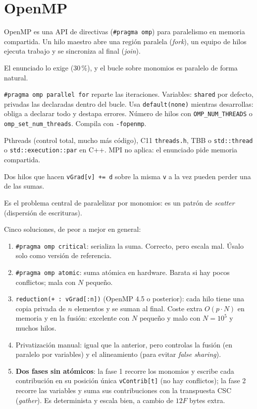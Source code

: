 \section{OpenMP}\label{tema:omp}

\que OpenMP es una API de directivas (\texttt{\#pragma omp}) para paralelismo en memoria compartida. Un hilo maestro abre una región paralela (\emph{fork}), un equipo de hilos ejecuta trabajo y se sincroniza al final (\emph{join}).

\porque El enunciado lo exige (30\,\%), y el bucle sobre monomios es paralelo de forma natural.

\como \texttt{\#pragma omp parallel for} reparte las iteraciones. Variables: \texttt{shared} por defecto, privadas las declaradas dentro del bucle. Usa \texttt{default(none)} mientras desarrollas: obliga a declarar todo y destapa errores. Número de hilos con \texttt{OMP\_NUM\_THREADS} o \texttt{omp\_set\_num\_threads}. Compila con \texttt{-fopenmp}.

\alt Pthreads (control total, mucho más código), C11 \texttt{threads.h}, TBB o \texttt{std::thread} o \texttt{std::execution::par} en C++. MPI no aplica: el enunciado pide memoria compartida.

\que Dos hilos que hacen \texttt{vGrad[v] += d} sobre la misma \texttt{v} a la vez pueden perder una de las sumas.

\porque Es el problema central de paralelizar por monomios: es un patrón de \emph{scatter} (dispersión de escrituras).

\como Cinco soluciones, de peor a mejor en general:
\begin{enumerate}
\item \texttt{\#pragma omp critical}: serializa la suma. Correcto, pero escala mal. Úsalo solo como versión de referencia.
\item \texttt{\#pragma omp atomic}: suma atómica en hardware. Barata si hay pocos conflictos; mala con $N$ pequeño.
\item \texttt{reduction(+ : vGrad[:n])} (OpenMP 4.5 o posterior): cada hilo tiene una copia privada de $n$ elementos y se suman al final. Coste extra $O(p\cdot N)$ en memoria y en la fusión: excelente con $N$ pequeño y malo con $N=10^5$ y muchos hilos.
\item Privatización manual: igual que la anterior, pero controlas la fusión (en paralelo por variables) y el alineamiento (para evitar \emph{false sharing}).
\item \textbf{Dos fases sin atómicos}: la fase 1 recorre los monomios y escribe cada contribución en su posición única \texttt{vContrib[t]} (no hay conflictos); la fase 2 recorre las variables y suma sus contribuciones con la transpuesta CSC (\emph{gather}). Es determinista y escala bien, a cambio de $12F$ bytes extra.
\end{enumerate}


